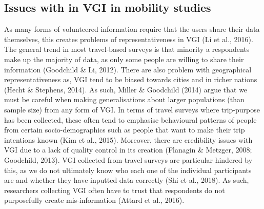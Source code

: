 \subsection{Issues with in VGI in mobility studies}
As many forms of volunteered information require that the users share their data themselves, this creates problems of representativeness in VGI (Li et al., 2016). The general trend in most travel-based surveys is that minority a respondents make up the majority of data, as only some people are willing to share their information (Goodchild \& Li, 2012).
There are also problem with geographical representativeness as, VGI tend to be biased towards cities and in richer nations (Hecht \& Stephens, 2014). As such, Miller \& Goodchild (2014) argue that we must be careful when making generalisations about larger populations (than sample size) from any form of VGI. In terms of travel surveys where trip-purpose has been collected, these often tend to emphasise behavioural patterns of people from certain socio-demographics such as people that want to make their trip intentions known (Kim et al., 2015).
Moreover, there are credibility issues with VGI due to a lack of quality control in its creation (Flanagin \& Metzger, 2008; Goodchild, 2013). VGI collected from travel surveys are particular hindered by this, as we do not ultimately know who each one of the individual participants are and whether they have inputted data correctly (Shi et al., 2018). As such, researchers collecting VGI often have to trust that respondents do not purposefully create mis-information (Attard et al., 2016).

